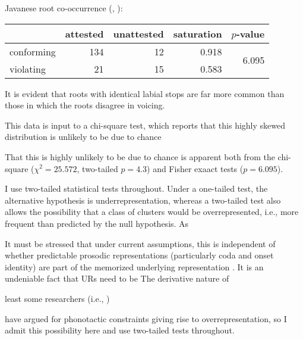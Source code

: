 
\ex Javanese root co-occurrence (\citealp[][264]{Uhlenbeck1950}, \citealp[][139]{Mester1988}): \vspace{6pt} \\
\begin{tabular}{l r r r r}
\toprule
           & attested & unattested & saturation & $p$-value \\
\midrule
conforming & 134      & 12         & 0.918      & \multirow{2}{*}{6.095\e{-06}} \\
violating  & 21       & 15         & 0.583 \\
\bottomrule
\end{tabular}
\xe

\noindent
It is evident that roots with identical labial stops are far more common than those in which the roots disagree in voicing. 

This data is input to a chi-square test, which reports that this highly skewed distribution is unlikely to be due to chance 

That this is highly unlikely to be due to chance is apparent both from the chi-square ($\chi^2 = 25.572$, two-tailed $p = 4.3$) and Fisher exaact tests ($p =  6.095$). 

I use two-tailed statistical tests throughout. 
Under a one-tailed test, the alternative hypothesis is underrepresentation, whereas a two-tailed test also allows the possibility that a class of clusters would be overrepresented, i.e., more frequent than predicted by the null hypothesis. As 

\citet{Pierrehumbert1994}

It must be stressed that under current assumptions, this is independent of whether predictable prosodic representations (particularly coda and onset identity) are part of the memorized underlying representation \citep[e.g.,][]{Vaux2003}.
It is an undeniable fact that URs need to be 
The derivative nature of 
\citet{Ito1989a,Noske1992}

least some researchers (i.e., \citealt{Mester1988}) 

 \citep[e.g.,]{Brown2010} have argued for phonotactic constraints giving rise to overrepresentation, so I admit this possibility here and use two-tailed tests throughout. 


